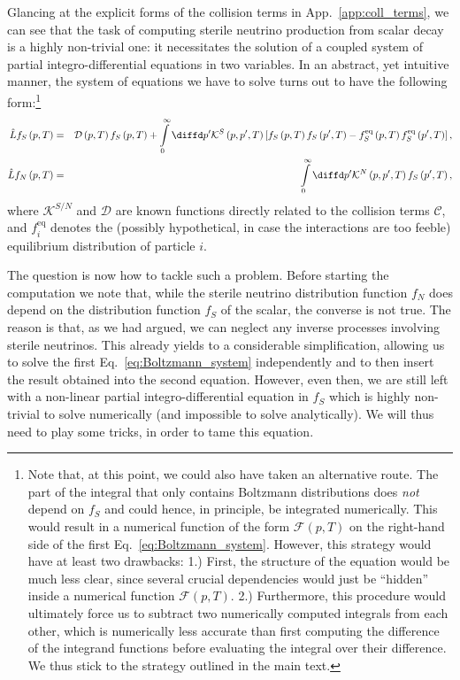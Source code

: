 Glancing at the explicit forms of the collision terms in App.~\ref{app:coll_terms}, we can see that the task of computing sterile neutrino production from scalar decay is a highly non-trivial one: it necessitates the solution of a coupled system of partial integro-differential equations in two variables. In an abstract, yet intuitive manner, the system of equations we have to solve turns out to have the following form:\footnote{Note that, at this point, we could also have taken an alternative route. The part of the integral that only contains Boltzmann distributions does \emph{not} depend on $f_S$ and could hence, in principle, be integrated numerically. This would result in a numerical function of the form $\mathcal{F}(p,T)$ on the right-hand side of the first Eq.~\eqref{eq:Boltzmann_system}. However, this strategy would have at least two drawbacks: 1.) First, the structure of the equation would be much less clear, since several crucial dependencies would just be ``hidden'' inside a numerical function $\mathcal{F}(p,T)$. 2.) Furthermore, this procedure would ultimately force us to subtract two numerically computed integrals from each other, which is numerically less accurate than first computing the difference of the integrand functions before evaluating the integral over their difference. We thus stick to the strategy outlined in the main text.} 
\begin{eqnarray}
 \hat{L} f_S\left(p,T\right) &=& \mathcal{D}\left(p,T\right) f_S\left(p,T\right) + \int\limits_{0}^{\infty}{\diffd p'\mathcal{K}^{S}\left(p,p',T\right)\left[f_S\left(p,T\right) f_S\left(p',T\right) - f_S^{\mathrm{eq}}\left(p,T\right) f_S^{\mathrm{eq}}\left(p',T\right) \right]}  \,, \nonumber\\
 \hat{L} f_N\left(p,T\right) &=& \int\limits_{0}^{\infty}{\diffd p'\mathcal{K}^N\left(p,p',T\right) f_S\left(p',T\right)} \,,  \label{eq:Boltzmann_system}
\end{eqnarray}
where $\mathcal{K}^{S/N}$ and $\mathcal{D}$ are known functions directly related to the collision terms $\mathcal{C}$, and $f_i^{\mathrm{eq}}$ denotes the (possibly hypothetical, in case the interactions are too feeble) equilibrium distribution of particle $i$.

The question is now how to tackle such a problem. Before starting the computation we note that, while the sterile neutrino distribution function $f_N$ does depend on the distribution function $f_S$ of the scalar, the converse is not true. The reason is that, as we had argued, we can neglect any inverse processes involving sterile neutrinos. This already yields to a considerable simplification, allowing us to solve the first Eq.~\eqref{eq:Boltzmann_system} independently and to then insert the result obtained into the second equation. However, even then, we are still left with a non-linear partial integro-differential equation in $f_S$ which is highly non-trivial to solve numerically (and impossible to solve analytically). We will thus need to play some tricks, in order to tame this equation.

